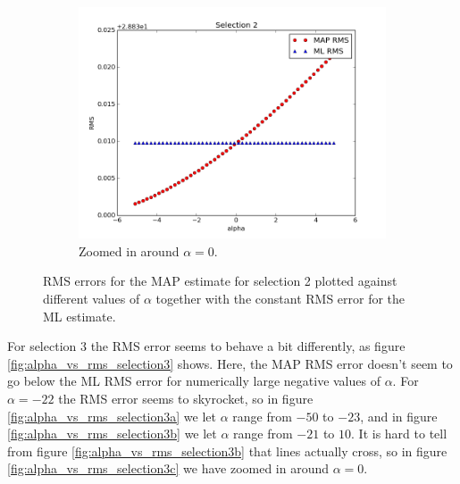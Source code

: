 \documentclass[a4paper]{article}
\begin{document}
\begin{figure}[H]
\begin{adjustwidth}{-7em}{-7em}
    \begin{subfigure}{.32\linewidth}
      \includegraphics[width=\linewidth]{figures/alpha_vs_rms_selection2c.png}
      \caption{Zoomed in around $\alpha = 0$.}
      \label{fig:alpha_vs_rms_selection2c}
    \end{subfigure}
  \end{adjustwidth}
  \caption{RMS errors for the MAP estimate for selection 2 plotted against different values of $\alpha$ together with the constant RMS error for the ML estimate.}
  \label{fig:alpha_vs_rms_selection2}
\end{figure}

For selection 3 the RMS error seems to behave a bit differently, as figure \ref{fig:alpha_vs_rms_selection3} shows. Here, the MAP RMS error doesn't seem to go below the ML RMS error for numerically large negative values of $\alpha$. For $\alpha = -22$ the RMS error seems to skyrocket, so in figure \ref{fig:alpha_vs_rms_selection3a} we let $\alpha$ range from $-50$ to $-23$, and in figure \ref{fig:alpha_vs_rms_selection3b} we let $\alpha$ range from $-21$ to $10$. It is hard to tell from figure \ref{fig:alpha_vs_rms_selection3b} that lines actually cross, so in figure \ref{fig:alpha_vs_rms_selection3c} we have zoomed in around $\alpha = 0$.
\end{document}
